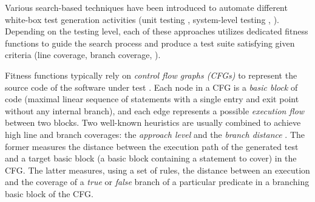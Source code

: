 
\label{section:bbc:introduction}

Various search-based techniques have been introduced to automate different white-box test generation activities (\eg unit testing \cite{fraser2012whole,Fraser2011}, system-level testing \cite{arcuri2019restful}, \etc). Depending on the testing level, each of these approaches utilizes dedicated fitness functions to guide the search process and produce a test suite satisfying given criteria (\eg line coverage, branch coverage, \etc). 
 
Fitness functions typically rely on \textit{control flow graphs (CFGs)} to represent the source code of the software under test \cite{McMinn2004}. Each node in a CFG is a \textit{basic block} of code (\ie maximal linear sequence of statements with a single entry and exit point without any internal branch), and each edge represents a possible \textit{execution flow} between two blocks.
Two well-known heuristics are usually combined to achieve high line and branch coverages: the \textit{approach level} and the \textit{branch distance} \cite{McMinn2004}. The former measures the distance between the execution path of the generated test and a target basic block (\ie a basic block containing a statement to cover) in the CFG. The latter measures, using a set of rules, the distance between an execution and the coverage of a \textit{true} or \textit{false} branch of a particular predicate in a branching basic block of the CFG.


